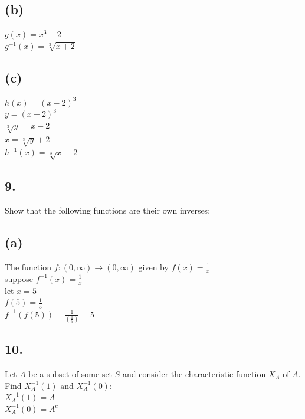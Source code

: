 \documentclass[11pt]{article}
\begin{document}
\subsection*{(b)}
\begin{center}
$g(x) = x^{3} - 2$\\
\hfill \break
$g^{-1}(x) = \sqrt[3]{x+2}$
\end{center}

\subsection*{(c)}
\begin{center}
$h(x) = (x - 2)^{3}$\\
\hfill \break
$y = (x - 2)^{3}$\\
$\sqrt[3]{y} = x - 2$\\
$x = \sqrt[3]{y} + 2$\\
$h^{-1}(x) = \sqrt[3]{x} + 2$
\end{center}
%
%
\subsection*{9.}
\begin{center}
Show that the following functions are their own inverses:
\end{center}

\subsection*{(a)}
\begin{center}
The function $f : (0,\infty) \rightarrow (0,\infty)$ given by $f(x) = \frac{1}{x}$\\
\hfill \break
suppose $f^{-1}(x) = \frac{1}{x}$\\
let $x = 5$\\
$f(5) = \frac{1}{5}$\\
\hfill \break
$f^{-1}(f(5)) = \frac{1}{(\frac{1}{5})} = 5$
\end{center}
%
%
\subsection*{10.}
\begin{center}
Let $A$ be a subset of some set $S$ and consider the characteristic function $X_{A}$ of $A$.\\
Find $X_{A}^{-1}(1) \text { and } X_{A}^{-1}(0)$:\\
\hfill \break
$X_{A}^{-1}(1) = A$\\
\hfill \break
$X_{A}^{-1}(0) = A^{c}$
\end{center}
%
%
\hfill \break
\hfill \break
\hfill \break
\end{document}
